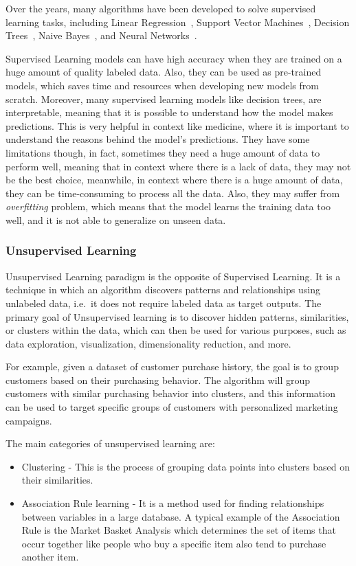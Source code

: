 Over the years, many algorithms have been developed to solve supervised learning tasks, including Linear Regression~\citep{james2013introduction}, Support Vector Machines~\citep{cortes1995support}, Decision Trees~\citep{breiman2017classification}, Naive Bayes~\citep{mccallum1998comparison}, and Neural Networks~\citep{lecun1998gradient}.

Supervised Learning models can have high accuracy when they are trained on a huge amount of quality labeled data.
Also, they can be used as pre-trained models, which saves time and resources when developing new models from scratch.
Moreover, many supervised learning models like decision trees, are interpretable, meaning that it is possible to understand how the model makes predictions.
This is very helpful in context like medicine, where it is important to understand the reasons behind the model's predictions.
They have some limitations though, in fact, sometimes they need a huge amount of data to perform well, meaning that in context where there is a lack of data, they may not be the best choice, meanwhile, in context where there is a huge amount of data, they can be time-consuming to process all the data.
Also, they may suffer from \textit{overfitting} problem, which means that the model learns the training data too well, and it is not able to generalize on unseen data.


\subsubsection{Unsupervised Learning}
\label{subsubsec:unsupervised_ml}
Unsupervised Learning paradigm is the opposite of Supervised Learning.
It is a technique in which an algorithm discovers patterns and relationships using unlabeled data, i.e.\ it does not require labeled data as target outputs.
The primary goal of Unsupervised learning is to discover hidden patterns, similarities, or clusters within the data, which can then be used for various purposes, such as data exploration, visualization, dimensionality reduction, and more.

For example, given a dataset of customer purchase history, the goal is to group customers based on their purchasing behavior.
The algorithm will group customers with similar purchasing behavior into clusters, and this information can be used to target specific groups of customers with personalized marketing campaigns.

The main categories of unsupervised learning are:
\begin{itemize}
    \item Clustering - This is the process of grouping data points into clusters based on their similarities.

    \item Association Rule learning - It is a method used for finding relationships between variables in a large database.
    A typical example of the Association Rule is the Market Basket Analysis which determines the set of items that occur together like people who buy a specific item also tend to purchase another item.

\end{itemize}

